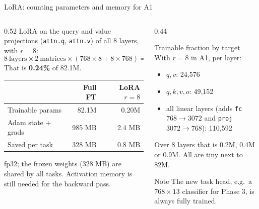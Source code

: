 \documentclass[aspectratio=169,11pt]{beamer}
\newcommand{\code}[1]{\texttt{\small #1}}
\begin{document}
\begin{frame}{LoRA: counting parameters and memory for A1}
  \begin{columns}[T]
    \begin{column}{0.52\textwidth}
      \small
      LoRA on the query and value projections (\code{attn.q}, \code{attn.v}) of all 8 layers, with $r=8$:
      \[
        8\ \text{layers}\times2\ \text{matrices}\times(768\times8+8\times768)=196{,}608
      \]
      That is \textbf{0.24\%} of 82.1M.
      \vspace{2mm}

      \begin{tabular}{@{}lrr@{}}
        \toprule
        & Full FT & LoRA $r=8$\\
        \midrule
        Trainable params & 82.1M & 0.20M\\
        Adam state + grads & 985 MB & 2.4 MB\\
        Saved per task & 328 MB & 0.8 MB\\
        \bottomrule
      \end{tabular}
      \vspace{1mm}

      {\scriptsize fp32; the frozen weights (328 MB) are shared by all tasks. Activation memory is still needed for the backward pass.}
    \end{column}
    \begin{column}{0.44\textwidth}
      \begin{block}{Trainable fraction by target}
        \small
        With $r=8$ in A1, per layer:
        \begin{itemize}
          \item $q, v$: 24,576
          \item $q, k, v, o$: 49,152
          \item all linear layers (adds \code{fc} $768\to3072$ and \code{proj} $3072\to768$): 110,592
        \end{itemize}
        Over 8 layers that is 0.2M, 0.4M or 0.9M. All are tiny next to 82M.
      \end{block}
      \begin{exampleblock}{Note}
        \small
        The new task head, e.g.\ a $768\times13$ classifier for Phase 3, is always fully trained.
      \end{exampleblock}
    \end{column}
  \end{columns}
\end{frame}
\end{document}
